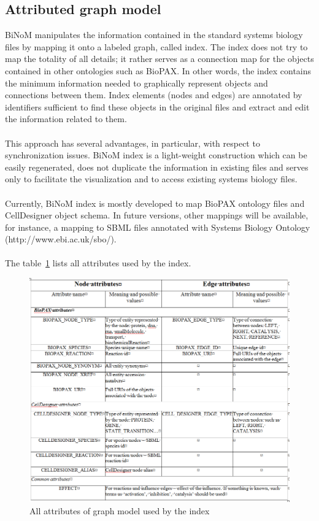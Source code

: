 \subsection{Attributed graph model}\label{Attributed_graph_model}
BiNoM manipulates the information contained in the standard systems biology files by mapping it onto a labeled graph, called index. The index does not try to map the totality of all details; it rather serves as a connection map for the objects contained in other ontologies such as BioPAX. In other words, the index contains the minimum information needed to graphically represent objects and connections between them. Index elements (nodes and edges) are annotated by identifiers sufficient to find these objects in the original files and extract and edit the information related to them.\\\\
This approach has several advantages, in particular, with respect to synchronization issues. BiNoM index is a light-weight construction which can be easily regenerated, does not duplicate the information in existing files and serves only to facilitate the visualization and to access existing systems biology files.\\\\
Currently, BiNoM index is mostly developed to map BioPAX ontology files and CellDesigner object schema. In future versions, other mappings will be available, for instance, a mapping to SBML files annotated with Systems Biology Ontology (http://www.ebi.ac.uk/sbo/).\\\\
The table~\ref{Attribute_table} lists all attributes used by the index.
\begin{figure}
\centering
\includegraphics[width=19 cm]{graphics/Attribute_table}
\caption{All attributes of graph model used by the index}
\label{Attribute_table}
\end{figure}


